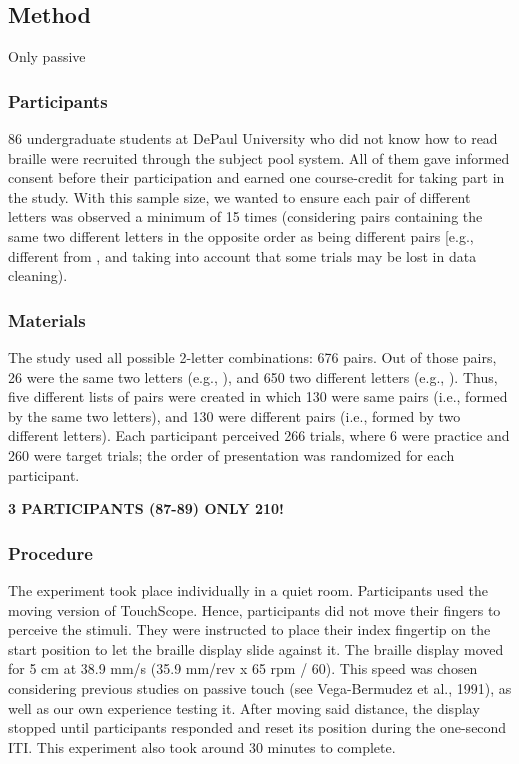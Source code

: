 \documentclass[english,man]{apa7}
\begin{document}
\hypertarget{method}{%
\subsection{Method}\label{method}}

Only passive

\hypertarget{participants}{%
\subsubsection{Participants}\label{participants}}

86 undergraduate students at DePaul University who did not know how to read braille were recruited through the subject pool system. All of them gave informed consent before their participation and earned one course-credit for taking part in the study. With this sample size, we wanted to ensure each pair of different letters was observed a minimum of 15 times (considering pairs containing the same two different letters in the opposite order as being different pairs {[}e.g.,   different from  \braille{l}{]}, and taking into account that some trials may be lost in data cleaning).

\hypertarget{materials}{%
\subsubsection{Materials}\label{materials}}

The study used all possible 2-letter combinations: 676 pairs. Out of those pairs, 26 were the same two letters (e.g.,  ), and 650 two different letters (e.g.,  ). Thus, five different lists of pairs were created in which 130 were same pairs (i.e., formed by the same two letters), and 130 were different pairs (i.e., formed by two different letters). Each participant perceived 266 trials, where 6 were practice and 260 were target trials; the order of presentation was randomized for each participant.

\textbf{3 PARTICIPANTS (87-89) ONLY 210!}

\hypertarget{procedure}{%
\subsubsection{Procedure}\label{procedure}}

The experiment took place individually in a quiet room. Participants used the moving version of TouchScope. Hence, participants did not move their fingers to perceive the stimuli. They were instructed to place their index fingertip on the start position to let the braille display slide against it. The braille display moved for 5 cm at 38.9 mm/s (35.9 mm/rev x 65 rpm / 60). This speed was chosen considering previous studies on passive touch (see Vega-Bermudez et al., 1991), as well as our own experience testing it. After moving said distance, the display stopped until participants responded and reset its position during the one-second ITI. This experiment also took around 30 minutes to complete.
\end{document}
